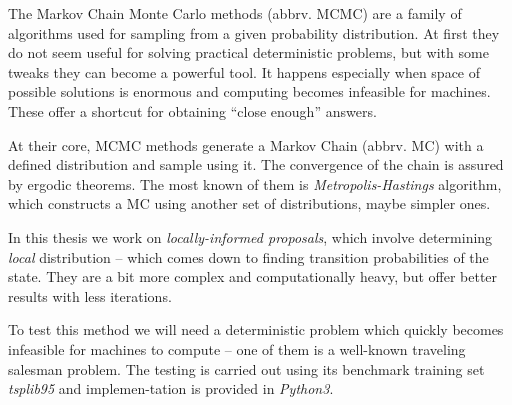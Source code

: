The Markov Chain Monte Carlo methods (abbrv. MCMC) are a family of algorithms used for sampling from a given probability distribution. At first they do not seem useful for solving practical deterministic problems, but with some tweaks they can become a powerful tool. It happens especially when space of possible solutions is enormous and computing becomes infeasible for machines. These offer a shortcut for obtaining ``close enough'' answers.
		
At their core, MCMC methods generate a Markov Chain (abbrv. MC) with a defined distribution and sample using it. The convergence of the chain is assured by ergodic theorems. The most known of them is \textit{Metropolis-Hastings} algorithm, which constructs a MC using another set of distributions, maybe simpler ones.

In this thesis we work on \textit{locally-informed proposals}, which involve determining \textit{local} distribution -- which comes down to finding transition probabilities of the state. They are a bit more complex and computationally heavy, but offer better results with less iterations. 

To test this method we will need a deterministic problem which quickly becomes infeasible for machines to compute -- one of them is a well-known traveling salesman problem. The testing is carried out using its benchmark training set \textit{tsplib95} and implemen-tation is provided in \textit{Python3}.